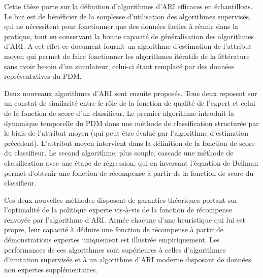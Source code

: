 \documentclass[9pt]{article}
\begin{document}
Cette thèse porte sur la définition d'algorithmes d'ARI efficaces en échantillons. Le but est de bénéficier de la souplesse d'utilisation des algorithmes supervisés, qui ne nécessitent pour fonctionner que des données faciles à réunir dans la pratique, tout en conservant la bonne capacité de généralisation des algorithmes d'ARI. A cet effet ce document fournit un algorithme d'estimation de l'attribut moyen qui permet de faire fonctionner les algorithmes itératifs de la littérature sans avoir besoin d'un simulateur, celui-ci étant remplacé par des données représentatives du PDM.

Deux nouveaux algorithmes d'ARI sont ensuite proposés. Tous deux reposent sur un constat de similarité entre le rôle de la fonction de qualité de l'expert et celui de la fonction de score d'un classifieur. Le premier algorithme introduit la dynamique temporelle du PDM dans une méthode de classification structurée par le biais de l'attribut moyen (qui peut être évalué par l'algorithme d'estimation précédent). L'attribut moyen intervient dans la définition de la fonction de score du classifieur. Le second algorithme, plus souple, cascade une méthode de classification avec une étape de régression, qui en inversant l'équation de Bellman permet d'obtenir une fonction de récompense à partir de la fonction de score du classifieur.

Ces deux nouvelles méthodes disposent de garanties théoriques portant sur l'optimalité de la politique experte vis-à-vis de la fonction de récompense renvoyée par l'algorithme d'ARI. Armée chacune d'une heuristique qui lui est propre, leur capacité à déduire une fonction de récompense à partir de démonstrations expertes uniquement est illustrée empiriquement. Les performances de ces algorithmes sont supérieures à celles d'algorithmes d'imitation supervisée et à un algorithme d'ARI moderne disposant de données non expertes supplémentaires. 
\end{document}
